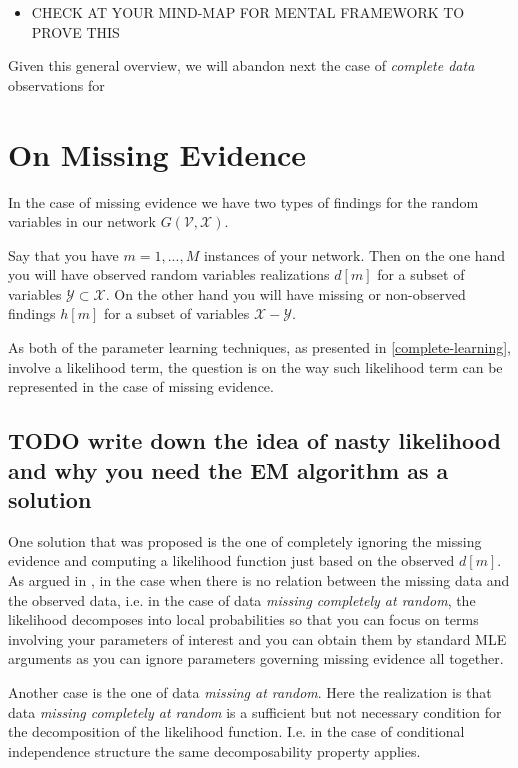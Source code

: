 \documentclass[11pt]{article}
\begin{document}
\begin{article}
\begin{itemize}
\item CHECK AT YOUR MIND-MAP FOR MENTAL FRAMEWORK TO PROVE THIS
\end{itemize}



Given this general overview, we will abandon next the case of
\emph{complete data} observations for  




\section{On Missing Evidence}
\label{sec:orgf96644a}

In the case of missing evidence we have two types of findings for
the random variables in our network \(G(\mathscr{V}, \mathscr{X})\).

Say that you have \(m = 1, ..., M\) instances of your network. Then on
the one hand you will have observed random variables realizations
\(d[m]\) for a subset of variables \(\mathscr{Y} \subset
  \mathscr{X}\). On the other hand you will have missing or
non-observed findings \(h[m]\) for a subset of variables
\(\mathscr{X} - \mathscr{Y}\).

As both of the parameter learning techniques, as presented in
\ref{complete-learning}, involve a likelihood term, the question is on
the way such likelihood term can be represented in the case of
missing evidence.

\subsection{{\bfseries\sffamily TODO} write down the idea of nasty likelihood and why you need the EM algorithm as a solution}
\label{sec:orgfd551be}

One solution that was proposed is the one of completely ignoring
the missing evidence and computing a likelihood function just based
on the observed \(d[m]\). As argued in \cite{koller2009probabilistic},
in the case when there is no relation between the missing data and
the observed data, i.e. in the case of data \emph{missing completely at
random}, the likelihood decomposes into local probabilities so that
you can focus on terms involving your parameters of interest and
you can obtain them by standard MLE arguments as you can ignore
parameters governing missing evidence all together.

Another case is the one of data \emph{missing at random}. Here the
realization is that data \emph{missing completely at random} is a
sufficient but not necessary condition for the decomposition of the
likelihood function. I.e. in the case of conditional independence
structure the same decomposability property applies.


\end{article}
\end{document}

